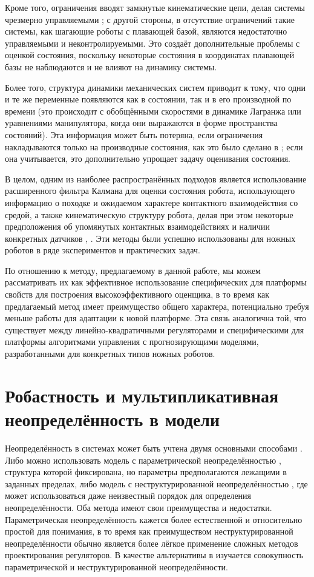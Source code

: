 Кроме того, ограничения вводят замкнутые кинематические цепи, делая системы чрезмерно управляемыми \cite{Furieri2017}; с другой стороны, в отсутствие ограничений такие системы, как шагающие роботы с плавающей базой, являются недостаточно управляемыми и неконтролируемыми. Это создаёт дополнительные проблемы с оценкой состояния, поскольку некоторые состояния в координатах плавающей базы не наблюдаются и не влияют на динамику системы. 

Более того, структура динамики механических систем приводит к тому, что одни и те же переменные появляются как в состоянии, так и в его производной по времени (это происходит с обобщёнными скоростями в динамике Лагранжа или уравнениями манипулятора, когда они выражаются в форме пространства состояний). Эта информация может быть потеряна, если ограничения накладываются только на производные состояния, как это было сделано в \cite{Mason2017}; если она учитывается, это дополнительно упрощает задачу оценивания состояния.

В целом, одним из наиболее распространённых подходов является использование расширенного фильтра Калмана для оценки состояния робота, использующего информацию о походке и ожидаемом характере контактного взаимодействия со средой, а также кинематическую структуру робота, делая при этом некоторые предположения об упомянутых контактных взаимодействиях и наличии конкретных датчиков \cite{Bloesch2012}, \cite{Teng2021}. Эти методы были успешно использованы для ножных роботов в ряде экспериментов и практических задач.

По отношению к методу, предлагаемому в данной работе, мы можем рассматривать их как эффективное использование специфических для платформы свойств для построения высокоэффективного оценщика, в то время как предлагаемый метод имеет преимущество общего характера, потенциально требуя меньше работы для адаптации к новой платформе. Эта связь аналогична той, что существует между линейно-квадратичными регуляторами и специфическими для платформы алгоритмами управления с прогнозирующими моделями, разработанными для конкретных типов ножных роботов.

\section{Робастность и мультипликативная неопределённость в модели}\label{sec:ch1/sec5}

Неопределённость в системах может быть учтена двумя основными способами \cite{Radek2017}. Либо можно использовать модель с параметрической неопределённостью \cite{barmish1994new, Bhattacharyya2009}, структура которой фиксирована, но параметры предполагаются лежащими в заданных пределах, либо модель с неструктурированной неопределённостью \cite{Doyle2009, Kucera2007}, где может использоваться даже неизвестный порядок для определения неопределённости. Оба метода имеют свои преимущества и недостатки. Параметрическая неопределённость кажется более естественной и относительно простой для понимания, в то время как преимуществом неструктурированной неопределённости обычно является более лёгкое применение сложных методов проектирования регуляторов. В качестве альтернативы в \cite{Tan2003} изучается совокупность параметрической и неструктурированной неопределённости.

